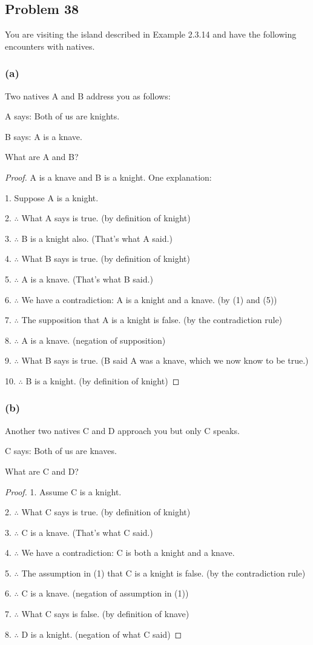 \documentclass[14pt]{extarticle}
\begin{document}
\subsection{Problem 38}
You are visiting the island described in Example 2.3.14 and have the following
encounters with natives.

\subsubsection{(a)}
Two natives A and B address you as follows:

A says: Both of us are knights.

B says: A is a knave.

What are A and B?

\begin{proof}
A is a knave and B is a knight. One explanation:

1. Suppose A is a knight.

2. $\therefore$ What A says is true. (by definition of knight)

3. $\therefore$ B is a knight also. (That’s what A said.)

4. $\therefore$ What B says is true. (by definition of knight)

5. $\therefore$ A is a knave. (That’s what B said.)

6. $\therefore$ We have a contradiction: A is a knight and a knave. (by (1) and
(5))

7. $\therefore$ The supposition that A is a knight is false. (by
the contradiction rule)

8. $\therefore$ A is a knave. (negation of supposition)

9. $\therefore$ What B says is true. (B said A was a knave,
which we now know to be true.)

10. $\therefore$ B is a knight. (by definition of knight)
\end{proof}

\subsubsection{(b)}
Another two natives C and D approach you but only C speaks.

C says: Both of us are knaves.

What are C and D?

\begin{proof}
1. Assume C is a knight.

2. $\therefore$ What C says is true. (by definition of knight)

3. $\therefore$ C is a knave. (That's what C said.)

4. $\therefore$ We have a contradiction: C is both a knight and a knave.

5. $\therefore$ The assumption in (1) that C is a knight is false. (by the
contradiction rule)

6. $\therefore$ C is a knave. (negation of assumption in (1))

7. $\therefore$ What C says is false. (by definition of knave)

8. $\therefore$ D is a knight. (negation of what C said)
\end{proof}
\end{document}
